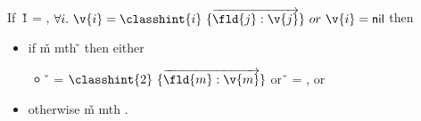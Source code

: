 \begin{assumption}[\invokejavamethodliteral] \label{assumption:method}
  If\ {\v{1}} = {},
  $\forall i.\ {\v{i}}={\classvalue{\classhint{i}}{\overrightarrow{\classfieldpair{\fld{j}} {\v{j}}}}}\ or\ {\v{i}}={\nil}$
         then 
         \begin{itemize}
           \item if
   {\v{m}} {mth}
                    {} {}
                    {}
                    {\v{}}
                  then either
                  \begin{itemize}
                    \item
                  \v{} = ${\classvalue{\classhint{2}}{\overrightarrow{\classfieldpair{\fld{m}} {\v{m}}}}}$
                  or\ 
                  \v{} = \nil,  or
                  \end{itemize}
          \item
            otherwise
   {\v{m}} {mth}
                    {} {}
                    {\classhint{2}}
                    {}.
        \end{itemize}
\end{assumption}

